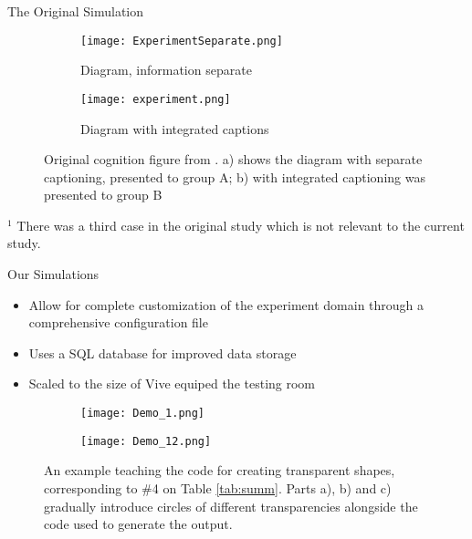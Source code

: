 \documentclass[22pt]{beamer}
\begin{document}
\begin{frame}[fragile]
\begin{textblock}{7.25}
\begin{block}{The Original Simulation}
\begin{figure}
  \begin{subfigure}[t]{0.30\textwidth}
    \texttt{[image: ExperimentSeparate.png]}
    \caption{Diagram, information separate}				%
    \label{a} 
  \end{subfigure}
    \begin{subfigure}[t]{0.41\textwidth}
    \texttt{[image: experiment.png]}
    \caption{Diagram with integrated captions}				%
    \label{a} 
  \end{subfigure}    
  \caption{Original cognition figure from \cite{cerpa1996some}. a) shows the diagram with separate captioning, presented to group A; b) with integrated captioning was presented to group B\label{fig:orig}}
\end{figure}
{\tiny $^1$ There was a third case in the original study which is not relevant to the current study.}
\end{block}

\begin{block}{Our Simulations}
\begin{itemize}
\item Allow for complete customization of the experiment domain through a  comprehensive configuration file
\item Uses a SQL database for improved data storage
\item Scaled to the size of Vive equiped the testing room
\end{itemize}
\begin{figure}
  \begin{subfigure}[b]{0.34\textwidth}
    \texttt{[image: Demo\_1.png]}
    \caption{}
    \label{fig:1}
  \end{subfigure}
  \begin{subfigure}[b]{0.339\textwidth}
    \texttt{[image: Demo\_12.png]}
    \caption{}
    \label{fig:2}
  \end{subfigure}

      \caption{An example teaching the code for creating transparent shapes, corresponding to \#4 on Table \ref{tab:summ}. Parts a), b) and c) gradually introduce circles of different transparencies alongside the code used to generate the output.}
\end{figure}
\end{block}


\end{textblock}




\end{frame}
\end{document}
